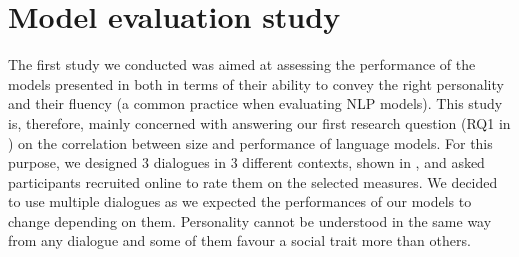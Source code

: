 \documentclass[nomenclature, english, biblatex]{kththesis}
\begin{document}
\section{Model evaluation study}
The first study we conducted was aimed at assessing the performance of the models presented in  both in terms of their ability to convey the right personality and their fluency (a common practice when evaluating \gls{NLP} models). This study is, therefore, mainly concerned with answering our first research question (RQ1 in ) on the correlation between size and performance of language models. For this purpose, we designed 3 dialogues in 3 different contexts, shown in , and asked participants recruited online to rate them on the selected measures. We decided to use multiple dialogues as we expected the performances of our models to change depending on them. Personality cannot be understood in the same way from any dialogue and some of them favour a social trait more than others. 
\end{document}
